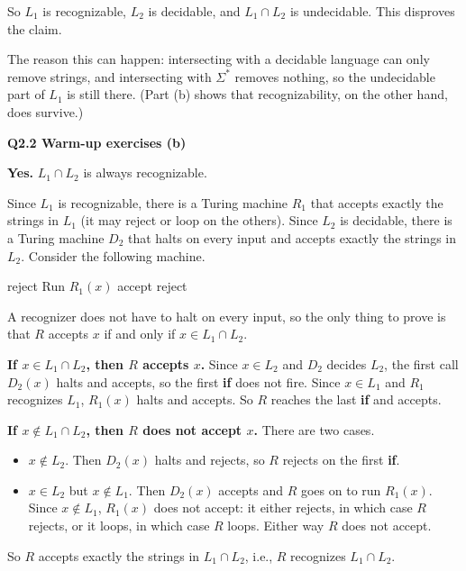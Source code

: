 \documentclass[11pt]{article}
\newcommand{\qpage}[1]{\clearpage\noindent\textbf{\large #1}\par\medskip}
\begin{document}
So $L_1$ is recognizable, $L_2$ is decidable, and $L_1 \cap L_2$ is undecidable.
This disproves the claim.

The reason this can happen: intersecting with a decidable language can only remove strings, and intersecting with $\Sigma^*$ removes nothing, so the undecidable part of $L_1$ is still there.
(Part (b) shows that recognizability, on the other hand, does survive.)

\qpage{Q2.2 Warm-up exercises (b)}

\textbf{Yes.} $L_1 \cap L_2$ is always recognizable.

Since $L_1$ is recognizable, there is a Turing machine $R_1$ that accepts exactly the strings in $L_1$ (it may reject or loop on the others).
Since $L_2$ is decidable, there is a Turing machine $D_2$ that halts on every input and accepts exactly the strings in $L_2$.
Consider the following machine.

\begin{algorithmic}[1]
     \Return reject
    \EndIf
    \State Run $R_1(x)$ 
     \Return accept
    \Else{} \Return reject
    \EndIf
  \EndFunction
\end{algorithmic}

A recognizer does not have to halt on every input, so the only thing to prove is that $R$ accepts $x$ if and only if $x \in L_1 \cap L_2$.

\textbf{If $x \in L_1 \cap L_2$, then $R$ accepts $x$.}
Since $x \in L_2$ and $D_2$ decides $L_2$, the first call $D_2(x)$ halts and accepts, so the first \textbf{if} does not fire.
Since $x \in L_1$ and $R_1$ recognizes $L_1$, $R_1(x)$ halts and accepts.
So $R$ reaches the last \textbf{if} and accepts.

\textbf{If $x \notin L_1 \cap L_2$, then $R$ does not accept $x$.}
There are two cases.
\begin{itemize}
  \item $x \notin L_2$. Then $D_2(x)$ halts and rejects, so $R$ rejects on the first \textbf{if}.
  \item $x \in L_2$ but $x \notin L_1$. Then $D_2(x)$ accepts and $R$ goes on to run $R_1(x)$.
  Since $x \notin L_1$, $R_1(x)$ does not accept: it either rejects, in which case $R$ rejects, or it loops, in which case $R$ loops.
  Either way $R$ does not accept.
\end{itemize}
So $R$ accepts exactly the strings in $L_1 \cap L_2$, i.e., $R$ recognizes $L_1 \cap L_2$.
\end{document}
